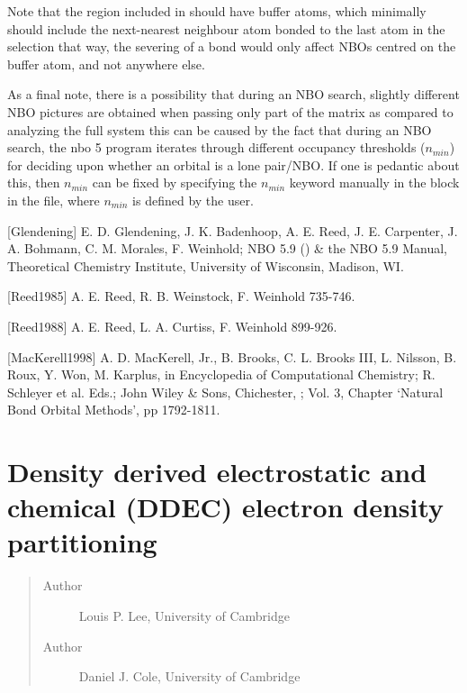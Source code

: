 \documentclass[letterpaper,10pt,english]{sphinxmanual}
\begin{document}
Note that the region included in  should
have buffer atoms, which minimally should include the next-nearest
neighbour atom bonded to the last atom in the selection \textendash{} that way, the
severing of a bond would only affect NBOs centred on the buffer atom,
and not anywhere else.

As a final note, there is a possibility that during an NBO search,
slightly different NBO pictures are obtained when passing only part of
the matrix as compared to analyzing the full system \textendash{} this can be caused
by the fact that during an NBO search, the nbo 5 program iterates
through different occupancy thresholds (\(n_{min}\)) for deciding
upon whether an orbital is a lone pair/NBO. If one is pedantic about
this, then \(n_{min}\) can be fixed by specifying the
\(n_{min}\) keyword manually in the  block in
the  file, where \(n_{min}\) is defined by the user.

{[}Glendening{]} E. D. Glendening, J. K. Badenhoop, A. E. Reed, J. E. Carpenter, J. A. Bohmann, C. M. Morales, F. Weinhold; NBO 5.9 () \& the NBO 5.9 Manual, Theoretical Chemistry Institute, University of Wisconsin, Madison, WI.

{[}Reed1985{]} A. E. Reed, R. B. Weinstock, F. Weinhold    735-746.

{[}Reed1988{]} A. E. Reed, L. A. Curtiss, F. Weinhold    899-926.

{[}MacKerell1998{]} A. D. MacKerell, Jr., B. Brooks, C. L. Brooks III, L. Nilsson, B. Roux, Y. Won, M. Karplus, in Encyclopedia of Computational Chemistry; R. Schleyer et al. Eds.; John Wiley \& Sons, Chichester, ; Vol. 3, Chapter ‘Natural Bond Orbital Methods’, pp 1792-1811.


\section{Density derived electrostatic and chemical (DDEC) electron density partitioning}
\label{\detokenize{ddec::doc}}\label{\detokenize{ddec:density-derived-electrostatic-and-chemical-ddec-electron-density-partitioning}}\begin{quote}\begin{description}
\item[{Author}] \leavevmode
Louis P. Lee, University of Cambridge

\item[{Author}] \leavevmode
Daniel J. Cole, University of Cambridge

\end{description}\end{quote}
\end{document}
